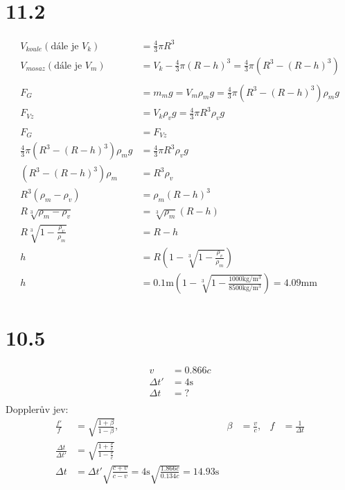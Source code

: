 \documentclass{article}
\begin{document}
    \section*{11.2}
    $$
    \begin{aligned}
        V_{koule} (\text{dále je $V_k$}) &= \frac{4}{3}\pi R^3\\
        V_{mosaz} (\text{dále je $V_m$}) &= V_k - \frac{4}{3}\pi (R-h)^3 = \frac{4}{3} \pi (R^3-(R-h)^3)\\
        \\
        F_G &= m_m g = V_m \rho_m g = \frac{4}{3} \pi (R^3-(R-h)^3) \rho_m g\\
        F_{Vz} &= V_k \rho_v g = \frac{4}{3}\pi R^3 \rho_v g\\
        \\
        F_G &= F_{Vz}\\
        \frac{4}{3} \pi (R^3-(R-h)^3) \rho_m g &= \frac{4}{3}\pi R^3 \rho_v g\\
        (R^3-(R-h)^3) \rho_m &= R^3 \rho_v\\
        R^3(\rho_m-\rho_v) &= \rho_m(R-h)^3\\
        R\sqrt[3]{\rho_m-\rho_v} &= \sqrt[3]{\rho_m}(R-h)\\
        R\sqrt[3]{1-\frac{\rho_v}{\rho_m}}&=R-h\\
        h &= R(1-\sqrt[3]{1-\frac{\rho_v}{\rho_m}})\\
        h &= 0.1 \si{\meter} (1-\sqrt[3]{1-\frac{1000 \si{\kilogram\per\cubic\meter}}{8500 \si{\kilogram\per\cubic\meter}}}) = 4.09 \si{\milli\meter}
    \end{aligned}
    $$
    \section*{10.5}
    $$
    \begin{aligned}
        v &= 0.866 c\\
        \Delta t' &= 4\si{\second}\\
        \Delta t &= ?\\
    \end{aligned}
    $$
    Dopplerův jev:
   $$
   \begin{aligned}
       \frac{f'}{f} &= \sqrt{\frac{1 + \beta}{1-\beta}},& \beta &= \frac{v}{c},& f &= \frac{1}{\Delta t}\\
       \frac{\Delta t}{\Delta t'} &= \sqrt{\frac{1 + \frac{v}{c}}{1-\frac{v}{c}}}\\
       \Delta t &= \Delta t'\sqrt{\frac{c+v}{c-v}} = 4\si{\second}\sqrt{\frac{1.866c}{0.134c}} = 14.93 \si{\second}
   \end{aligned}
   $$
\end{document}
